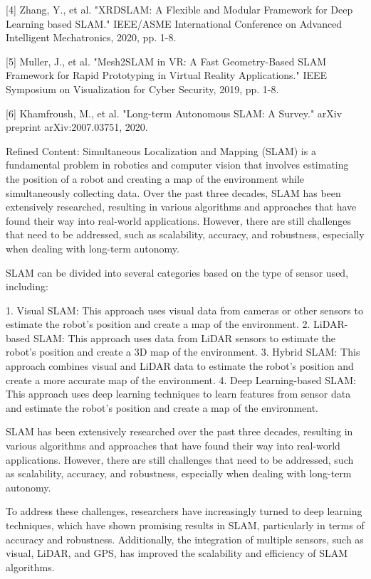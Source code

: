 \documentclass[conference]{IEEEtran}
\begin{document}
[4] Zhang, Y., et al. "XRDSLAM: A Flexible and Modular Framework for Deep Learning based SLAM." IEEE/ASME International Conference on Advanced Intelligent Mechatronics, 2020, pp. 1-8.

[5] Muller, J., et al. "Mesh2SLAM in VR: A Fast Geometry-Based SLAM Framework for Rapid Prototyping in Virtual Reality Applications." IEEE Symposium on Visualization for Cyber Security, 2019, pp. 1-8.

[6] Khamfroush, M., et al. "Long-term Autonomous SLAM: A Survey." arXiv preprint arXiv:2007.03751, 2020.

Refined Content:
Simultaneous Localization and Mapping (SLAM) is a fundamental problem in robotics and computer vision that involves estimating the position of a robot and creating a map of the environment while simultaneously collecting data. Over the past three decades, SLAM has been extensively researched, resulting in various algorithms and approaches that have found their way into real-world applications. However, there are still challenges that need to be addressed, such as scalability, accuracy, and robustness, especially when dealing with long-term autonomy.

SLAM can be divided into several categories based on the type of sensor used, including:

1. Visual SLAM: This approach uses visual data from cameras or other sensors to estimate the robot's position and create a map of the environment.
2. LiDAR-based SLAM: This approach uses data from LiDAR sensors to estimate the robot's position and create a 3D map of the environment.
3. Hybrid SLAM: This approach combines visual and LiDAR data to estimate the robot's position and create a more accurate map of the environment.
4. Deep Learning-based SLAM: This approach uses deep learning techniques to learn features from sensor data and estimate the robot's position and create a map of the environment.

SLAM has been extensively researched over the past three decades, resulting in various algorithms and approaches that have found their way into real-world applications. However, there are still challenges that need to be addressed, such as scalability, accuracy, and robustness, especially when dealing with long-term autonomy.

To address these challenges, researchers have increasingly turned to deep learning techniques, which have shown promising results in SLAM, particularly in terms of accuracy and robustness. Additionally, the integration of multiple sensors, such as visual, LiDAR, and GPS, has improved the scalability and efficiency of SLAM algorithms.
\end{document}
